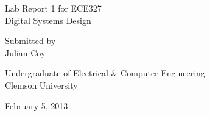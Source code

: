 \documentclass[11pt]{report}
\begin{document}
\begin{spacing}{1.5}

\thispagestyle{empty}

\begin{scshape}

\vspace*{30pt}
{
\Huge
\begin{center}
    \reporttitle
\end{center}
}
\vspace{30pt}

{
\Large
\begin{center}
  Lab Report 1 for ECE327 \\
  Digital Systems Design
\end{center}
}
\vspace{30pt}
{
\Large 
\begin{center}
  Submitted by \\
  Julian Coy
\end{center}
}
\vspace{120pt}

{
\Large
\begin{center}
  Undergraduate of Electrical \& Computer Engineering \\
  Clemson University
\end{center}
}
\vspace{30pt}

{
\Large
\begin{center}
  February 5, 2013
\end{center}
}

\end{scshape}

\clearpage
\setcounter{page}{1}


\vspace{15pt}
  \setcounter{chapter}{1}

\end{spacing}
\end{document}

